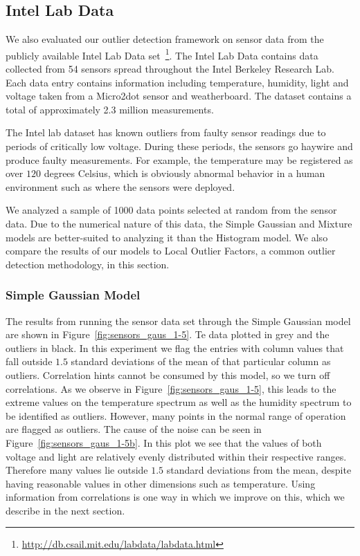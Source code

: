 \subsection{Intel Lab Data}
\label{sec:intel-lab-data-evaluation}

We also evaluated our outlier detection framework on sensor data from the publicly available Intel Lab Data set~\footnote{\url{http://db.csail.mit.edu/labdata/labdata.html}}. The Intel Lab Data contains data collected from 54 sensors spread throughout the Intel Berkeley Research Lab. Each data entry contains information including temperature, humidity, light and voltage taken from a Micro2dot sensor and weatherboard. The dataset contains a total of approximately 2.3 million measurements.

The Intel lab dataset has known outliers from faulty sensor readings due to periods of critically low voltage. During these periods, the sensors go haywire and produce faulty measurements.
For example, the temperature may be registered as over $120$ degrees Celsius, which is obviously abnormal behavior in a human environment such as where the sensors were deployed.
 
We analyzed a sample of 1000 data points selected at random from the sensor data. 
Due to the numerical nature of this data, the Simple Gaussian and Mixture models are better-suited to analyzing it than the Histogram model.
We also compare the results of our models to Local Outlier Factors, a common outlier detection methodology, in this section.
 
\subsubsection{Simple Gaussian Model}

The results from running the sensor data set through the Simple Gaussian model are shown in Figure~\ref{fig:sensors_gaus_1-5}.
Te data plotted in grey and the outliers in black.
In this experiment we flag the entries with column values that fall outside $1.5$ standard deviations of the mean of that particular column as outliers.
Correlation hints cannot be consumed by this model, so we turn off correlations.
As we observe in Figure~\ref{fig:sensors_gaus_1-5}, this leads to the extreme values on the temperature spectrum as well as the humidity spectrum to be identified as outliers.
However, many points in the normal range of operation are flagged as outliers.
The cause of the noise can be seen in Figure~\ref{fig:sensors_gaus_1-5b}.
In this plot we see that the values of both voltage and light are relatively evenly distributed within their respective ranges.
Therefore many values lie outside $1.5$ standard deviations from the mean, despite having reasonable values in other dimensions such as temperature.
Using information from correlations is one way in which we improve on this, which we describe in the next section.


